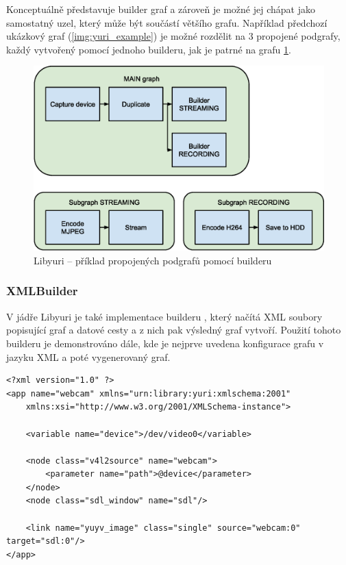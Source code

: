 \documentclass[thesis=M,czech]{FITthesis}[2012/06/26]
\begin{document}
Konceptuálně představuje builder graf a zároveň je možné jej chápat jako samostatný uzel, který může být součástí většího grafu. Například předchozí ukázkový graf (\ref{img:yuri_example}) je možné rozdělit na 3 propojené podgrafy, každý vytvořený pomocí jednoho builderu, jak je patrné na grafu \ref{img:yuri_subgraph}.
\\
\begin{figure}[h]\centering
	\includegraphics[width=1\textwidth]{images/yuri_subgraph.eps}
	\caption{Libyuri -- příklad propojených podgrafů pomocí builderu}\label{img:yuri_subgraph}
\end{figure}

\subsubsection{XMLBuilder} \label{subsec:analyza_yuri_vytvoreni_xml}
V jádře Libyuri je také implementace builderu , který načítá XML soubory popisující graf a datové cesty a z nich pak výsledný graf vytvoří. Použití tohoto builderu je demonstrováno dále, kde je nejprve uvedena konfigurace grafu v jazyku XML a poté vygenerovaný graf.
\\
\lstset{language=XML}
\begin{lstlisting}
<?xml version="1.0" ?>
<app name="webcam" xmlns="urn:library:yuri:xmlschema:2001"
    xmlns:xsi="http://www.w3.org/2001/XMLSchema-instance">

    <variable name="device">/dev/video0</variable>    

    <node class="v4l2source" name="webcam">
        <parameter name="path">@device</parameter>
    </node>
    <node class="sdl_window" name="sdl"/>

    <link name="yuyv_image" class="single" source="webcam:0" target="sdl:0"/>
</app>
\end{lstlisting}
\end{document}
